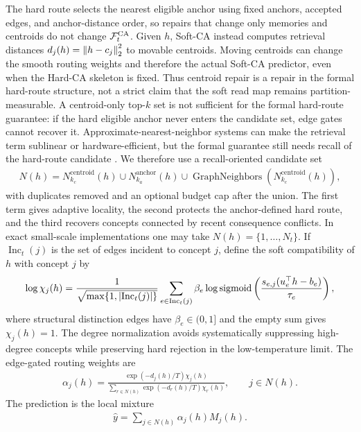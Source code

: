 The hard route selects the nearest eligible anchor using fixed anchors, accepted edges, and anchor-distance order, so repairs that change only memories and centroids do not change $\mathcal{F}_t^{\mathrm{CA}}$. Given $h$, Soft-CA instead computes retrieval distances $d_j(h)=\left\lVert h-c_j\right\rVert_2^2$ to movable centroids. Moving centroids can change the smooth routing weights and therefore the actual Soft-CA predictor, even when the Hard-CA skeleton is fixed. Thus centroid repair is a repair in the formal hard-route structure, not a strict claim that the soft read map remains partition-measurable. A centroid-only top-$k$ set is not sufficient for the formal hard-route guarantee: if the hard eligible anchor never enters the candidate set, edge gates cannot recover it. Approximate-nearest-neighbor systems can make the retrieval term sublinear or hardware-efficient, but the formal guarantee still needs recall of the hard-route candidate \citep{indyk1998approximate,johnson2019billion}. We therefore use a recall-oriented candidate set
\begin{align*}
N(h)=
N_{k_c}^{\mathrm{centroid}}(h)
\cup
N_{k_a}^{\mathrm{anchor}}(h)
\cup
\operatorname{GraphNeighbors}\left(N_{k_c}^{\mathrm{centroid}}(h)\right),
\end{align*}
with duplicates removed and an optional budget cap after the union. The first term gives adaptive locality, the second protects the anchor-defined hard route, and the third recovers concepts connected by recent consequence conflicts. In exact small-scale implementations one may take $N(h)=\{1,\ldots,N_t\}$. If $\operatorname{Inc}_t(j)$ is the set of edges incident to concept $j$, define the soft compatibility of $h$ with concept $j$ by
\begin{align*}
\log \chi_j(h)=
\frac{1}{\sqrt{\max\{1,\left\lvert\operatorname{Inc}_t(j)\right\rvert\}}}
\sum_{e\in \operatorname{Inc}_t(j)}
\beta_e\log \operatorname{sigmoid}\left(\frac{s_{e,j}(u_e^\top h-b_e)}{\tau_e}\right),
\end{align*}
where structural distinction edges have $\beta_e\in(0,1]$ and the empty sum gives $\chi_j(h)=1$. The degree normalization avoids systematically suppressing high-degree concepts while preserving hard rejection in the low-temperature limit. The edge-gated routing weights are
\begin{align}
\alpha_j(h)=
\frac{\exp(-d_j(h)/T)\chi_j(h)}
{\sum_{r\in N(h)}\exp(-d_r(h)/T)\chi_r(h)},
\qquad j\in N(h).
\label{eq:edge-gated-routing}
\end{align}
The prediction is the local mixture
\begin{align*}
\hat y=\sum_{j\in N(h)}\alpha_j(h)M_j(h).
\end{align*}

